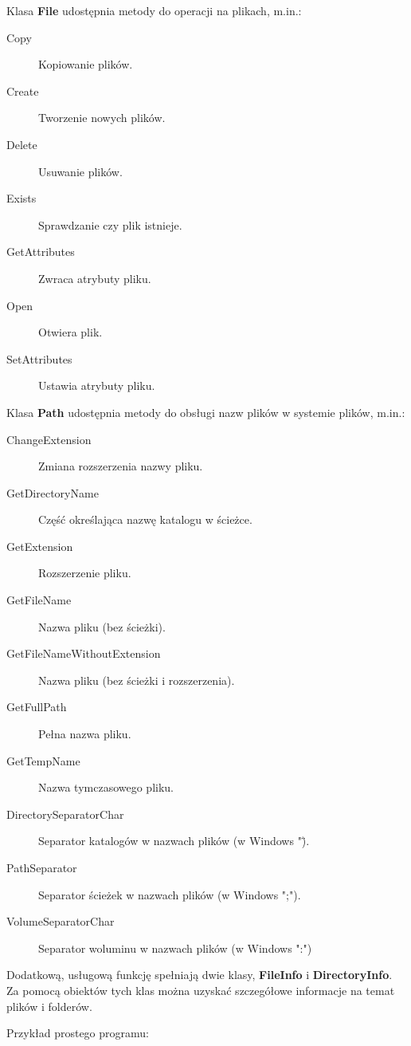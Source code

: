 Klasa {\bf File} udostępnia metody do operacji na plikach, m.in.:
\begin{description}
\item [Copy] Kopiowanie plików.
\item [Create] Tworzenie nowych plików.
\item [Delete] Usuwanie plików. 
\item [Exists] Sprawdzanie czy plik istnieje.
\item [GetAttributes] Zwraca atrybuty pliku.
\item [Open] Otwiera plik.
\item [SetAttributes] Ustawia atrybuty pliku.
\end{description}

Klasa {\bf Path} udostępnia metody do obsługi nazw plików w systemie plików, m.in.:
\begin{description}
\item [ChangeExtension] Zmiana rozszerzenia nazwy pliku.
\item [GetDirectoryName] Część określająca nazwę katalogu w ścieżce.
\item [GetExtension] Rozszerzenie pliku.
\item [GetFileName] Nazwa pliku (bez ścieżki).
\item [GetFileNameWithoutExtension] Nazwa pliku (bez ścieżki i rozszerzenia).
\item [GetFullPath] Pełna nazwa pliku.
\item [GetTempName] Nazwa tymczasowego pliku.
\item [DirectorySeparatorChar] Separator katalogów w nazwach plików (w Windows "\").
\item [PathSeparator] Separator ścieżek w nazwach plików (w Windows ";").
\item [VolumeSeparatorChar] Separator woluminu w nazwach plików (w Windows ":")
\end{description}

Dodatkową, usługową funkcję spełniają dwie klasy, {\bf FileInfo} i {\bf DirectoryInfo}. Za pomocą
obiektów tych klas można uzyskać szczegółowe informacje na temat plików i folderów.

Przykład prostego programu:

